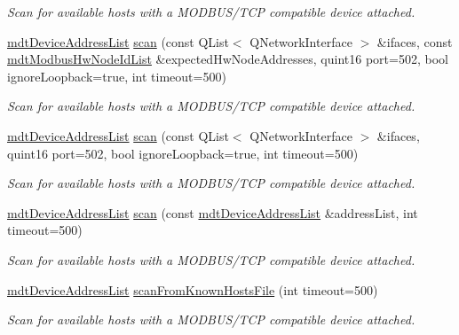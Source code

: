 \begin{DoxyCompactItemize}
\begin{DoxyCompactList}\small\item\em Scan for available hosts with a M\-O\-D\-B\-U\-S/\-T\-C\-P compatible device attached. \end{DoxyCompactList}\item 
\hyperlink{classmdt_device_address_list}{mdt\-Device\-Address\-List} \hyperlink{classmdt_modbus_tcp_port_manager_afd35d312b00db720e8629f600117ad03}{scan} (const Q\-List$<$ Q\-Network\-Interface $>$ \&ifaces, const \hyperlink{classmdt_modbus_hw_node_id_list}{mdt\-Modbus\-Hw\-Node\-Id\-List} \&expected\-Hw\-Node\-Addresses, quint16 port=502, bool ignore\-Loopback=true, int timeout=500)
\begin{DoxyCompactList}\small\item\em Scan for available hosts with a M\-O\-D\-B\-U\-S/\-T\-C\-P compatible device attached. \end{DoxyCompactList}\item 
\hyperlink{classmdt_device_address_list}{mdt\-Device\-Address\-List} \hyperlink{classmdt_modbus_tcp_port_manager_a9c16813dce2ede0db582535fcb00a7ff}{scan} (const Q\-List$<$ Q\-Network\-Interface $>$ \&ifaces, quint16 port=502, bool ignore\-Loopback=true, int timeout=500)
\begin{DoxyCompactList}\small\item\em Scan for available hosts with a M\-O\-D\-B\-U\-S/\-T\-C\-P compatible device attached. \end{DoxyCompactList}\item 
\hyperlink{classmdt_device_address_list}{mdt\-Device\-Address\-List} \hyperlink{classmdt_modbus_tcp_port_manager_a7439b38bf79db9940a70472af8a52254}{scan} (const \hyperlink{classmdt_device_address_list}{mdt\-Device\-Address\-List} \&address\-List, int timeout=500)
\begin{DoxyCompactList}\small\item\em Scan for available hosts with a M\-O\-D\-B\-U\-S/\-T\-C\-P compatible device attached. \end{DoxyCompactList}\item 
\hyperlink{classmdt_device_address_list}{mdt\-Device\-Address\-List} \hyperlink{classmdt_modbus_tcp_port_manager_ae1ecf5d945dbe530e2bdb234bc65e2e6}{scan\-From\-Known\-Hosts\-File} (int timeout=500)
\begin{DoxyCompactList}\small\item\em Scan for available hosts with a M\-O\-D\-B\-U\-S/\-T\-C\-P compatible device attached. \end{DoxyCompactList}\item 

\end{DoxyCompactItemize}
